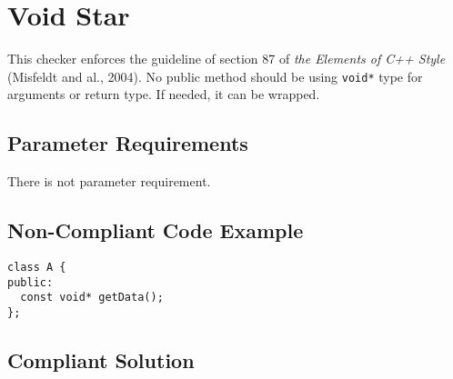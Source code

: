 %
%

\section{Void Star}
\label{VoidStar::overview}

This checker enforces the guideline of section 87 of \textit{the Elements
of C++ Style} (Misfeldt and al., 2004). No public method should be
using \texttt{void*} type for arguments or return type. If needed, it
can be wrapped.

\subsection{Parameter Requirements}

There is not parameter requirement.

\subsection{Non-Compliant Code Example}

\begin{verbatim}
class A {
public:
  const void* getData();
};
\end{verbatim}

\subsection{Compliant Solution}

